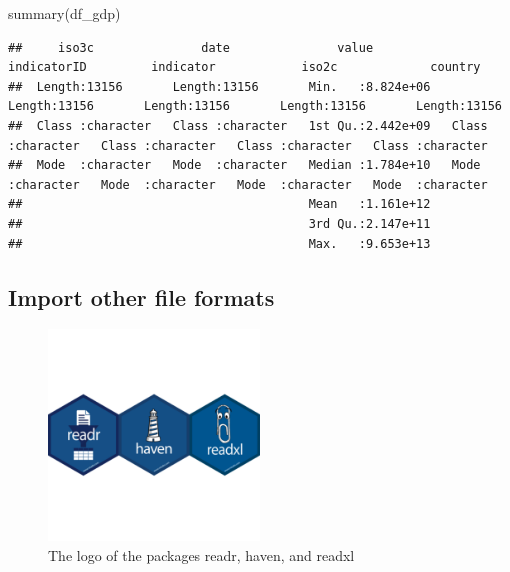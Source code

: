 \documentclass[
  12pt,
  oneside]{book}
\newenvironment{Shaded}{\begin{snugshade}}{\end{snugshade}}
\newcommand{\FunctionTok}[1]{\textcolor[rgb]{0.00,0.00,0.00}{#1}}
\newcommand{\NormalTok}[1]{#1}
\theoremstyle{definition}
\theoremstyle{definition}
\theoremstyle{definition}
\theoremstyle{definition}
\theoremstyle{remark}
\begin{document}
\begin{Shaded}
\begin{Highlighting}[]
\FunctionTok{summary}\NormalTok{(df\_gdp)}
\end{Highlighting}
\end{Shaded}

\begin{verbatim}
##     iso3c               date               value           indicatorID         indicator            iso2c             country         
##  Length:13156       Length:13156       Min.   :8.824e+06   Length:13156       Length:13156       Length:13156       Length:13156      
##  Class :character   Class :character   1st Qu.:2.442e+09   Class :character   Class :character   Class :character   Class :character  
##  Mode  :character   Mode  :character   Median :1.784e+10   Mode  :character   Mode  :character   Mode  :character   Mode  :character  
##                                        Mean   :1.161e+12                                                                              
##                                        3rd Qu.:2.147e+11                                                                              
##                                        Max.   :9.653e+13
\end{verbatim}

\hypertarget{import-other-file-formats}{%
\subsection{Import other file formats}\label{import-other-file-formats}}

\begin{figure}
\centering
\includegraphics[width=0.5\textwidth,height=\textheight]{fig/import-logo.pdf}
\caption{\label{fig:import-logo} The logo of the packages readr, haven, and readxl}
\end{figure}
\end{document}
